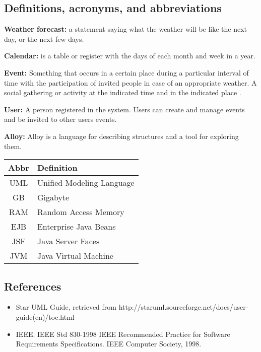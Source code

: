\subsection{Definitions, acronyms, and abbreviations}
\quad \par \textbf{Weather forecast:} a statement saying what the weather will be like the next day, or the next few days.
\par \textbf{Calendar:} is a table or register with the days of each month and week in a year.
\par \textbf{Event:} Something that occurs in a certain place during a particular interval of time with the participation of invited people in case of an appropriate weather. A social gathering or activity at the indicated time and in the indicated place .
\par \textbf{User:} A person registered in the system. Users can create and manage events and be invited to other users events. 

\par \textbf{Alloy:} Alloy is a language for describing structures and a tool for exploring them. 

\begin{center}
	\begin{tabular}{| c | l |}
		\hline
		\textbf{Abbr} & \textbf{Definition} \\ \hline
		UML & Unified Modeling Language \\ \hline
		GB & Gigabyte \\ \hline
		RAM & Random Access Memory \\ \hline
		EJB & Enterprise Java Beans  \\ \hline
		JSF & Java Server Faces  \\ \hline
		JVM & Java Virtual Machine \\ \hline
	\end{tabular}
\end{center}

\subsection{References}
\quad \begin{itemize}
         \item Star UML Guide, retrieved from http://staruml.sourceforge.net/docs/user-guide(en)/toc.html
         \item IEEE. IEEE Std 830-1998 IEEE Recommended Practice for Software Requirements Specifications. IEEE Computer Society, 1998.
       \end{itemize}

